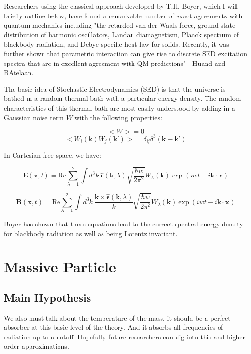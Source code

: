 \documentclass {article}
\renewcommand\vec{\mathbf}
\let\OldHat\hat
\renewcommand{\hat}[1]{\OldHat{\mathbf{#1}}}
\begin{document}
Researchers using the classical approach developed by T.H. Boyer, which I will briefly outline below, have found a remarkable number of exact agreements with quantum mechanics including "the retarded van der Waals force, ground state distribution of harmonic oscillators, Landau diamagnetism, Planck spectrum of blackbody radiation, and Debye specific-heat law for solids. Recently, it was further shown that parametric interaction can give rise to discrete SED excitation spectra that are in excellent agreement with QM predictions" - Huand and BAtelaan. 

The basic idea of Stochastic Electrodynamics (SED) is that the universe is bathed in a random thermal bath with a particular energy density. The random characteristics of this thermal bath are most easily understood by adding in a Gaussian noise term $W$ with the following properties:

$$<W> = 0$$
$$<W_i (\vec k) W_j (\vec k') > = \delta_{ij} \delta^3(\vec k - \vec k')$$

In Cartesian free space, we have:

$$\vec E (\vec x ,  t) = \text {Re} \sum_{\lambda = 1}^2  \int d^3k ~ \hat \epsilon(\vec k, \lambda) \sqrt {\frac {\hbar w} {2 \pi^2}} W_{\lambda}(\vec k) \exp(iwt - i\vec k \cdot \vec x)$$

$$\vec B (\vec x ,  t) = \text {Re} \sum_{\lambda = 1}^2  \int d^3k ~ \frac {\vec k \times \hat \epsilon(\vec k, \lambda)} k \sqrt {\frac {\hbar w} {2 \pi^2}} W_{\lambda}(\vec k) \exp(iwt - i\vec k \cdot \vec x)$$


Boyer has shown that these equations lead to the correct spectral energy density for blackbody radiation as well as being Lorentz invariant.




\newpage

\section{Massive Particle}
\subsection{Main Hypothesis}

We also must talk about the temperature of the mass, it should be a perfect absorber at this basic level of the theory. And it absorbs all frequencies of radiation up to a cutoff.  Hopefully future researchers can dig into this and higher order approximations.
\end{document}
